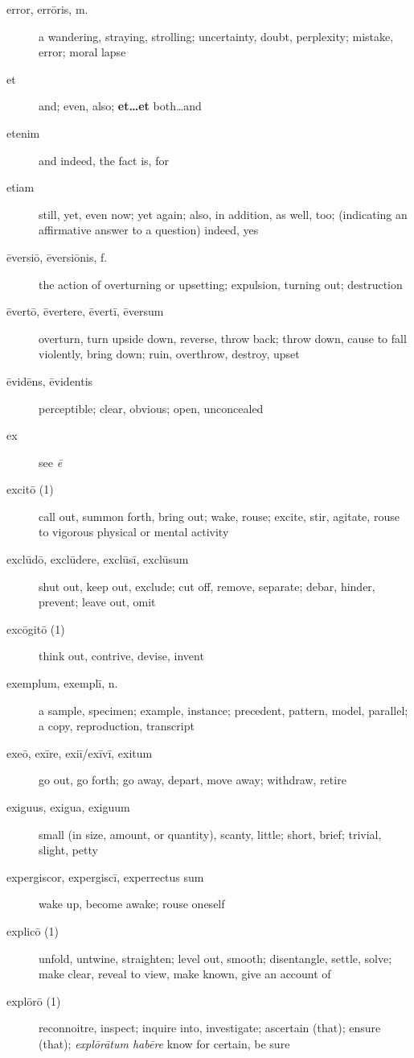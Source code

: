 \begin{description}
    \item[error, errōris, m.] \marginnote{*}a wandering, straying, strolling; uncertainty, doubt, perplexity; mistake, error; moral lapse
    \item[et] \marginnote{*}and; even, also; \textbf{et\dots et} both\dots and
    \item[etenim] and indeed, the fact is, for
    \item[etiam] \marginnote{*}still, yet, even now; yet again; also, in addition, as well, too; (indicating an affirmative answer to a question) indeed, yes
    \item[ēversiō, ēversiōnis, f.] the action of overturning or upsetting; expulsion, turning out; destruction
    \item[ēvertō, ēvertere, ēvertī, ēversum] overturn, turn upside down, reverse, throw back; throw down, cause to fall violently, bring down; ruin, overthrow, destroy, upset
    \item[ēvidēns, ēvidentis] perceptible; clear, obvious; open, unconcealed
    \item[ex] see \textit{ē}
    \item[excitō (1)] call out, summon forth, bring out; wake, rouse; excite, stir, agitate, rouse to vigorous physical or mental activity
    \item[exclūdō, exclūdere, exclūsī, exclūsum] shut out, keep out, exclude; cut off, remove, separate; debar, hinder, prevent; leave out, omit
    \item[excōgitō (1)] think out, contrive, devise, invent
    \item[exemplum, exemplī, n.] \marginnote{*}a sample, specimen; example, instance; precedent, pattern, model, parallel; a copy, reproduction, transcript
    \item[exeō, exīre, exiī/exīvī, exitum] \marginnote{*}go out, go forth; go away, depart, move away; withdraw, retire
    \item[exiguus, exigua, exiguum] small (in size, amount, or quantity), scanty, little; short, brief; trivial, slight, petty
    \item[expergiscor, expergiscī, experrectus sum] wake up, become awake; rouse oneself
    \item[explicō (1)] unfold, untwine, straighten; level out, smooth; disentangle, settle, solve; make clear, reveal to view, make known, give an account of
    \item[explōrō (1)] reconnoitre, inspect; inquire into, investigate; ascertain (that); ensure (that); \textit{explōrātum habēre} know for certain, be sure

\end{description}

